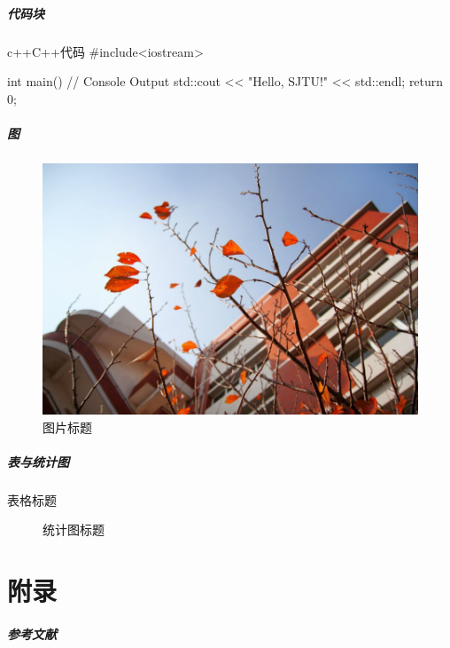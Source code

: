 \documentclass[
    aspectratio=169,                   %
]{beamer}
\begin{document}
    \begin{frame}[fragile]          %
        \frametitle{代码块}
        \begin{codeblock}{c++}{C++代码}
#include<iostream>

int main(){
    // Console Output
    std::cout << "Hello, SJTU!" << std::endl;
    return 0;
}
        \end{codeblock}
    \end{frame}

    \begin{frame}
        \frametitle{图}
        \begin{figure}
            \centering
            \begin{stampbox}
                \includegraphics[height=0.3\textheight]{vi/plant.jpg}
            \end{stampbox}
            \caption{图片标题\cite{viman}}
        \end{figure}
    \end{frame}

    \begin{frame}
        \frametitle{表与统计图}
        \begin{multicols}{2}
        \begin{table}
            \caption{表格标题\cite{pgfplotstableman}}
        \end{table}
        
        \begin{figure}
            
            \caption{统计图标题\cite{pgfplotsman}}
        \end{figure}
        \end{multicols}
    \end{frame}

\part{附录}

    \begin{frame}
        \frametitle{参考文献}
    \end{frame}

    \makebottom     %
\end{document}
